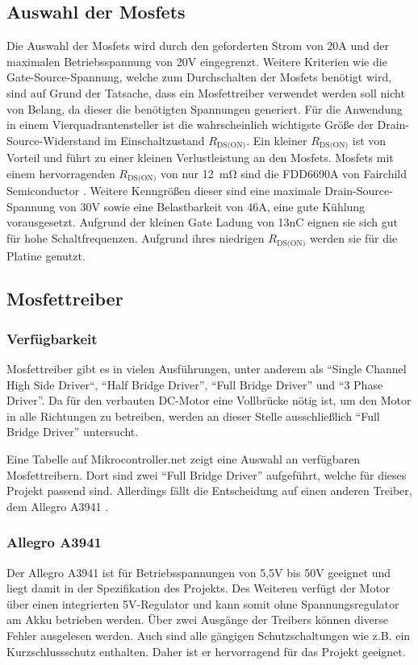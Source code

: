 \subsection{Auswahl der Mosfets}
Die Auswahl der Mosfets wird durch den geforderten Strom von 20A und der maximalen Betriebsspannung von 20V eingegrenzt. Weitere Kriterien wie die Gate-Source-Spannung, welche zum Durchschalten
der Mosfets benötigt wird, sind auf Grund der Tatsache, dass ein Mosfettreiber verwendet werden soll nicht von Belang, da dieser die benötigten Spannungen generiert.
Für die Anwendung in einem Vierquadrantensteller ist die wahrscheinlich wichtigste Größe der Drain-Source-Widerstand im Einschaltzustand $R_{\text{DS(ON)}}$.
Ein kleiner $R_{\text{DS(ON)}}$ ist von Vorteil und führt zu einer kleinen Verlustleistung an den Mosfets.
Mosfets mit einem hervorragenden $R_{\text{DS(ON)}}$ von nur \SI{12}{\mohm} sind die FDD6690A von Fairchild Semiconductor \cite{ds-fs}. Weitere Kenngrößen dieser sind
eine maximale Drain-Source-Spannung von 30V sowie eine Belastbarkeit von 46A, eine gute Kühlung vorausgesetzt. Aufgrund der kleinen Gate Ladung von 13nC eignen
sie sich gut für hohe Schaltfrequenzen. Aufgrund ihres niedrigen $R_{\text{DS(ON)}}$ werden sie für die Platine genutzt.


\subsection{Mosfettreiber}

\subsubsection{Verfügbarkeit}

Mosfettreiber gibt es in vielen Ausführungen, unter anderem als ``Single Channel High Side Driver``, ``Half Bridge Driver'', ``Full Bridge Driver''
und ``3 Phase Driver''. Da für den verbauten DC-Motor eine Vollbrücke nötig ist, um den Motor in alle Richtungen zu betreiben, werden an dieser Stelle
ausschließlich ``Full Bridge Driver'' untersucht.

Eine Tabelle auf Mikrocontroller.net\cite{FET_D_TABLE} zeigt eine Auswahl an ver\-füg\-ba\-ren Mosfettreibern. Dort sind zwei
``Full Bridge Driver'' aufgeführt, welche für dieses Projekt passend sind. Allerdings fällt die Entscheidung auf einen anderen Treiber,
dem Allegro A3941 \cite{ds-A3941}.
\subsubsection{Allegro A3941}
Der Allegro A3941  ist für Betriebsspannungen von 5,5V bis 50V geeignet und liegt damit in der Spezifikation des Projekts.
Des Weiteren verfügt der Motor über einen integrierten 5V-Regulator und kann somit ohne Spannungsregulator am Akku betrieben werden.
Über zwei Ausgänge der Treibers können diverse Fehler ausgelesen werden. Auch sind alle gängigen Schutzschaltungen wie z.B. ein Kurzschlussschutz enthalten.
Daher ist er hervorragend für das Projekt geeignet.


